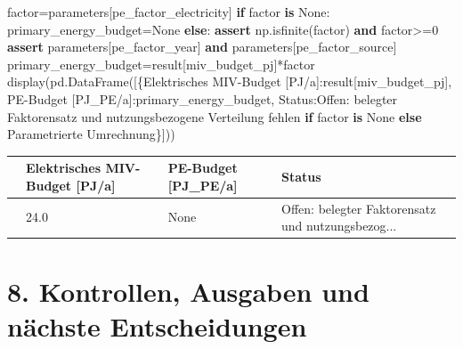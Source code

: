 \documentclass[
  ngerman,
  a4paper,
  DIV=11]{scrreprt}
\newenvironment{Shaded}{\begin{snugshade}}{\end{snugshade}}
\newcommand{\ControlFlowTok}[1]{\textcolor[rgb]{0.00,0.23,0.31}{\textbf{#1}}}
\newcommand{\DecValTok}[1]{\textcolor[rgb]{0.68,0.00,0.00}{#1}}
\newcommand{\KeywordTok}[1]{\textcolor[rgb]{0.00,0.23,0.31}{\textbf{#1}}}
\newcommand{\NormalTok}[1]{\textcolor[rgb]{0.00,0.23,0.31}{#1}}
\newcommand{\OperatorTok}[1]{\textcolor[rgb]{0.37,0.37,0.37}{#1}}
\newcommand{\StringTok}[1]{\textcolor[rgb]{0.13,0.47,0.30}{#1}}
\newcommand{\VariableTok}[1]{\textcolor[rgb]{0.07,0.07,0.07}{#1}}
\newcounter{none} %
\begin{document}
\begin{Shaded}
\begin{Highlighting}[]
\NormalTok{factor}\OperatorTok{=}\NormalTok{parameters[}\StringTok{\textquotesingle{}pe\_factor\_electricity\textquotesingle{}}\NormalTok{]}
\ControlFlowTok{if}\NormalTok{ factor }\KeywordTok{is} \VariableTok{None}\NormalTok{:}
\NormalTok{    primary\_energy\_budget}\OperatorTok{=}\VariableTok{None}
\ControlFlowTok{else}\NormalTok{:}
    \ControlFlowTok{assert}\NormalTok{ np.isfinite(factor) }\KeywordTok{and}\NormalTok{ factor}\OperatorTok{\textgreater{}=}\DecValTok{0}
    \ControlFlowTok{assert}\NormalTok{ parameters[}\StringTok{\textquotesingle{}pe\_factor\_year\textquotesingle{}}\NormalTok{] }\KeywordTok{and}\NormalTok{ parameters[}\StringTok{\textquotesingle{}pe\_factor\_source\textquotesingle{}}\NormalTok{]}
\NormalTok{    primary\_energy\_budget}\OperatorTok{=}\NormalTok{result[}\StringTok{\textquotesingle{}miv\_budget\_pj\textquotesingle{}}\NormalTok{]}\OperatorTok{*}\NormalTok{factor}
\NormalTok{display(pd.DataFrame([\{}\StringTok{\textquotesingle{}Elektrisches MIV{-}Budget [PJ/a]\textquotesingle{}}\NormalTok{:result[}\StringTok{\textquotesingle{}miv\_budget\_pj\textquotesingle{}}\NormalTok{],}
                      \StringTok{\textquotesingle{}PE{-}Budget [PJ\_PE/a]\textquotesingle{}}\NormalTok{:primary\_energy\_budget,}
                      \StringTok{\textquotesingle{}Status\textquotesingle{}}\NormalTok{:}\StringTok{\textquotesingle{}Offen: belegter Faktorensatz und nutzungsbezogene Verteilung fehlen\textquotesingle{}} \ControlFlowTok{if}\NormalTok{ factor }\KeywordTok{is} \VariableTok{None} \ControlFlowTok{else} \StringTok{\textquotesingle{}Parametrierte Umrechnung\textquotesingle{}}\NormalTok{\}]))}
\end{Highlighting}
\end{Shaded}

{\def\LTcaptype{none} %
\begin{longtable}[]{@{}llll@{}}
\toprule\noalign{}
& Elektrisches MIV-Budget {[}PJ/a{]} & PE-Budget {[}PJ\_PE/a{]} &
Status \\
\midrule\noalign{}
\endhead
\bottomrule\noalign{}
\endlastfoot
0 & 24.0 & None & Offen: belegter Faktorensatz und nutzungsbezog... \\
\end{longtable}
}

\section{8. Kontrollen, Ausgaben und nächste
Entscheidungen}\label{kontrollen-ausgaben-und-nuxe4chste-entscheidungen}
\end{document}
